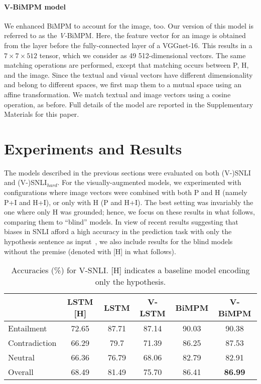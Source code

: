 \documentclass[11pt]{article}
\begin{document}
\paragraph{V-BiMPM model}
We enhanced BiMPM to account for the image, too. Our version of this
model is referred to as the {\em V-}BiMPM.
Here, the feature vector for an image is obtained from the layer before the fully-connected layer of a VGGnet-16. This results in a $7\times7\times512$ tensor, which we consider as 49 512-dimensional vectors.
The same matching operations are performed, except that matching occurs between P, H, and the image.
Since the textual and visual vectors have different dimensionality and belong to different spaces, we first map them to a mutual space using an affine transformation.
We match textual and image vectors using a cosine operation, as before. Full details of the model are reported in the Supplementary Materials for this paper.

 \section{Experiments and Results}
\label{sec:experiment}

The models described in the previous sections were evaluated on both
(V-)SNLI and (V-)SNLI$_{hard}$. For the visually-augmented models, we
experimented with configurations where image vectors were combined
with both P and H (namely P+I and H+I), or only with H (P and
H+I). The best setting was invariably the one where only H was
grounded; hence, we focus on these results in what follows, comparing
them to ``blind'' models. In view of recent results suggesting that
biases in SNLI afford a high accuracy in the prediction task with only
the hypothesis sentence as input~\cite{guru:anno18}, we also include
results for the blind models without the premise (denoted with [H] in
what follows).

\begin{table}
\small
\begin{center}
\begin{tabular}{|l|c||cccc|}
\hline
  & LSTM [H] & LSTM & V-LSTM &   BiMPM &V-BiMPM \\\hline
Entailment &  72.65 &87.71 & 87.14 &  90.03 & 90.38  \\
Contradiction &  66.29 &79.7&  71.39  & 86.25 &  87.53  \\
Neutral & 66.36 & 76.79 &  68.06 &   82.79 & 82.91  \\\hline
Overall & 68.49 & 81.49 &  75.70 &   86.41 & \textbf{86.99} \\
\hline
\end{tabular}
\end{center}
\caption{Accuracies (\%) for V-SNLI. [H] indicates a baseline model encoding only the hypothesis.} \label{tab:snli}
\end{table}
\end{document}
